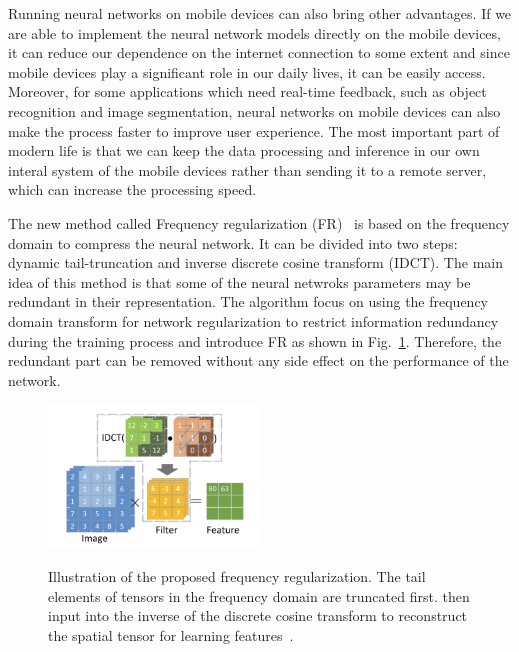 \documentclass{article}
\begin{document}
Running neural networks on mobile devices can also bring other advantages. If we are able to implement the neural network models directly on the mobile devices, it can reduce our dependence on the internet connection to some extent and since mobile devices play a significant role in our daily lives, it can be easily access. Moreover, for some applications which need real-time feedback, such as object recognition and image segmentation, neural networks on mobile devices can also make the process faster to improve user experience. The most important part of modern life is that we can keep the data processing and inference in our own interal system of the mobile devices rather than sending it to a remote server, which can increase the processing speed.

The new method called Frequency regularization (FR)~\cite{zhao2023frequency} is based on the frequency domain to compress the neural network. It can be divided into two steps: dynamic tail-truncation and inverse discrete cosine transform (IDCT). The main idea of this method is that some of the neural netwroks parameters may be redundant in their representation. The algorithm focus on using the frequency domain transform for network regularization to restrict information redundancy during the training process and introduce FR as shown in Fig.~\ref{idct}. Therefore, the redundant part can be removed without any side effect on the performance of the network.

\begin{figure}
	\vspace{-15pt}    %
	\includegraphics[width=0.5\textwidth]{figure/idct.png}\\
	\vspace{-15pt}    %
	\caption{Illustration of the proposed frequency regularization. The tail elements of tensors in the frequency domain are truncated first. then input into the inverse of the discrete cosine transform to reconstruct the spatial tensor for learning features~\cite{zhao2023frequency}.}
	\label{idct}
	\vspace{-15pt}    %
\end{figure}
\end{document}
